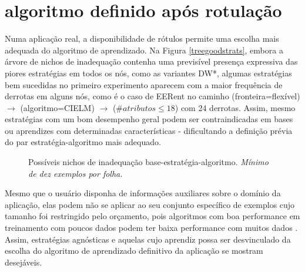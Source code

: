 \section{algoritmo definido após rotulação}\label{ind}
Numa aplicação real, a disponibilidade de rótulos permite uma escolha mais adequada
do algoritmo de aprendizado.
Na Figura \ref{treegoodstrats}, embora a árvore de nichos de inadequação contenha uma
previsível presença expressiva das piores estratégias em todos os nós, como as variantes DW*,
algumas estratégias bem sucedidas no primeiro experimento aparecem com a maior frequência
de derrotas em alguns nós, como é o caso de EERent no caminho
(fronteira=flexível) $\rightarrow$ (algoritmo=CIELM) $\rightarrow$ ($\#atributos \leq 18$)
com 24 derrotas.
Assim, mesmo estratégias com um bom desempenho geral podem ser contraindicadas em
bases ou aprendizes com determinadas características - dificultando a definição prévia
do par estratégia-algoritmo mais adequado.
\begin{figure}
\begin{center}
\caption{Possíveis nichos de inadequação base-estratégia-algoritmo.
\textit{Mínimo de dez exemplos por folha.}}
\begin{tikzpicture} [edge from parent/.style={->,above,draw,sloped,midway,gray!30,ultra thick},
text width=2.7cm, align=flush center, grow cyclic,
level 1/.style={level distance=3.2cm,sibling angle=180},
level 2/.style={text width=2cm, font=\footnotesize, level distance=3.2cm,sibling angle=60},
level 3/.style={text width=2cm, font=\footnotesize, level distance=3.2cm,sibling angle=60},
level 4/.style={text width=2cm, font=\footnotesize, level distance=3.2cm,sibling angle=60},
level 5/.style={text width=2cm, font=\footnotesize, level distance=3.2cm,sibling angle=60},
]

\label{treegoodstrats}
\end{tikzpicture}
\end{center}
\end{figure}
Mesmo que o usuário disponha de informações auxiliares sobre o domínio da aplicação,
elas podem não se aplicar ao seu conjunto específico de exemplos cujo tamanho foi restringido
pelo orçamento, pois algoritmos com boa performance em treinamento com poucos
dados podem ter baixa performance com muitos dados
\citep{journals/sigkdd/AttenbergP10,journals/jmlr/PerlichPS03}.
Assim, estratégias agnósticas e aquelas cujo aprendiz possa ser desvinculado da escolha do
algoritmo de aprendizado definitivo da aplicação se mostram desejáveis.

